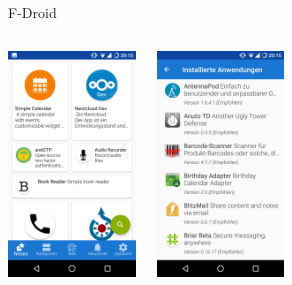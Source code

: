\begin{frame}{F-Droid}
  \begin{columns}
    \column{6.5cm}

    \begin{center}
      \includegraphics[height=6cm]{img/fdroid1.png}
    \par\end{center}

    \column{5cm}

    \begin{center}
      \includegraphics[height=6cm]{img/fdroid2.png}
    \par\end{center}
  \end{columns}
\end{frame}
